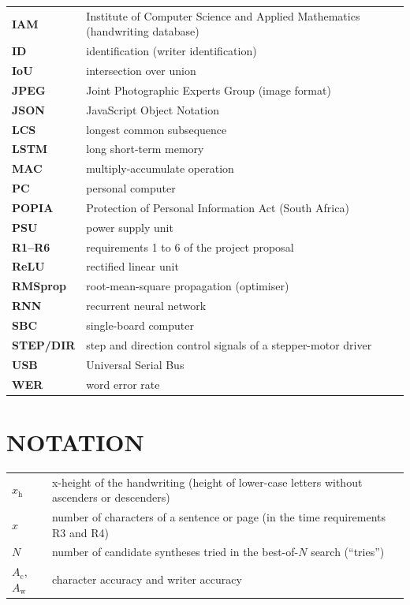 \begin{longtable}{p{3cm}p{11cm}}
  \textbf{IAM} & Institute of Computer Science and Applied Mathematics (handwriting database) \\
  \textbf{ID} & identification (writer identification) \\
  \textbf{IoU} & intersection over union \\
  \textbf{JPEG} & Joint Photographic Experts Group (image format) \\
  \textbf{JSON} & JavaScript Object Notation \\
  \textbf{LCS} & longest common subsequence \\
  \textbf{LSTM} & long short-term memory \\
  \textbf{MAC} & multiply-accumulate operation \\
  \textbf{PC} & personal computer \\
  \textbf{POPIA} & Protection of Personal Information Act (South Africa) \\
  \textbf{PSU} & power supply unit \\
  \textbf{R1--R6} & requirements 1 to 6 of the project proposal \\
  \textbf{ReLU} & rectified linear unit \\
  \textbf{RMSprop} & root-mean-square propagation (optimiser) \\
  \textbf{RNN} & recurrent neural network \\
  \textbf{SBC} & single-board computer \\
  \textbf{STEP/DIR} & step and direction control signals of a stepper-motor driver \\
  \textbf{USB} & Universal Serial Bus \\
  \textbf{WER} & word error rate \\
\end{longtable}
\endgroup

\section*{NOTATION}

\begingroup
\fontsize{10}{12}\selectfont
\begin{longtable}{p{3cm}p{11cm}}
  $x_{\mathrm{h}}$ & x-height of the handwriting (height of lower-case letters without ascenders or descenders) \\
  $x$ & number of characters of a sentence or page (in the time requirements R3 and R4) \\
  $N$ & number of candidate syntheses tried in the best-of-$N$ search (``tries'') \\
  $A_{\mathrm{c}}$, $A_{\mathrm{w}}$ & character accuracy and writer accuracy \\
\end{longtable}
\endgroup

